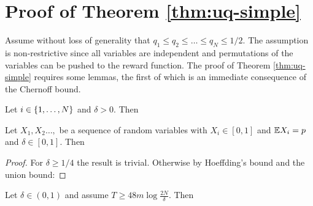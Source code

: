 

\section{Proof of Theorem \ref{thm:uq-simple}}\label{sec:thm:uq-simple}


Assume without loss of generality that $q_1 \leq q_2 \leq \ldots \leq q_N \leq 1/2$. The assumption is non-restrictive since all variables
are independent and permutations of the variables can be pushed to the reward function.
The proof of Theorem \ref{thm:uq-simple} requires some lemmas, the first of which is an immediate consequence of the Chernoff bound.


\begin{lemma}\label{lem:conc1}
Let $i \in \left\{1,\ldots, N\right\}$ and $\delta > 0$. Then
\end{lemma}

\begin{lemma}\label{lem:conc2}
Let $X_1,X_2\ldots,$ be a sequence of random variables with $X_i \in [0,1]$ and $\mathbb E X_i = p$ and $\delta \in [0,1]$.
Then 
\end{lemma}

\begin{proof}
For $\delta \geq 1/4$ the result is trivial. Otherwise 
by Hoeffding's bound and the union bound:
\end{proof}



\begin{lemma}\label{lem:m_est}
Let $\delta \in (0,1)$ and assume $T \geq 48m \log\frac{2N}{\delta}$. Then
\end{lemma}

